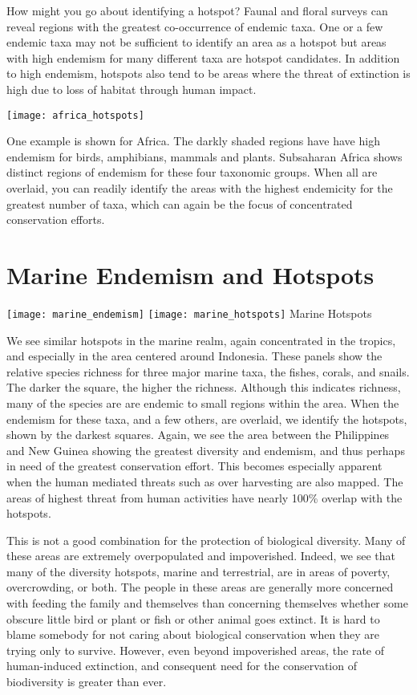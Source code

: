 \documentclass[letterpaper]{tufte-handout}
\begin{document}
How might you go about identifying a hotspot?  Faunal and floral surveys can reveal regions with the greatest co-occurrence of endemic taxa.  One or a few endemic taxa may not be sufficient to identify an area as a hotspot but areas with high endemism for many different taxa are hotspot candidates.  In addition to high endemism, hotspots also tend to be areas where the threat of extinction is high due to loss of habitat through human impact. 

\begin{marginfigure}%
	\texttt{[image: africa\_hotspots]}
\end{marginfigure} 

One example is shown for Africa.  The darkly shaded regions have have high endemism for birds, amphibians, mammals and plants.   Subsaharan Africa shows distinct regions of endemism for these four taxonomic groups.  When all are overlaid, you can readily identify the areas with the highest endemicity for the greatest number of taxa, which can again be the focus of concentrated conservation efforts.

\section{Marine Endemism and Hotspots}
\begin{marginfigure}%
	\texttt{[image: marine\_endemism]}
	\texttt{[image: marine\_hotspots]}
Marine Hotspots
\end{marginfigure} 

We see similar hotspots in the marine realm, again concentrated in the tropics, and especially in the area centered around Indonesia. These panels show the relative species richness for three major marine taxa, the fishes, corals, and snails.  The darker the square, the higher the richness.  Although this indicates richness, many of the species are are endemic to small regions within the area. When the endemism for these taxa, and a few others, are overlaid, we identify the hotspots, shown by the darkest squares. Again, we see the area between the Philippines and New Guinea showing the greatest diversity and endemism, and thus perhaps in need of the greatest conservation effort. This becomes especially apparent when the human mediated threats such as over harvesting are also mapped.  The areas of highest threat from human activities have nearly 100\% overlap with the hotspots.

This is not a good combination for the protection of biological diversity.  Many of these areas are extremely overpopulated and impoverished. Indeed, we see that many of the diversity hotspots, marine and terrestrial, are in areas of poverty, overcrowding, or both. The people in these areas are generally more concerned with feeding the family and themselves than concerning themselves whether some obscure little bird or plant or fish or other animal goes extinct. It is hard to blame somebody for not caring about biological conservation when they are trying only to survive. However, even beyond impoverished areas, the rate of human-induced extinction, and consequent need for the conservation of biodiversity is greater than ever. 
\end{document}
